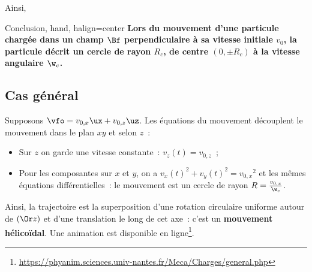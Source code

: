 \documentclass[../main/main.tex]{subfiles}
\begin{document}
Ainsi,
\begin{tror}{Conclusion, hand, halign=center}
    \bfseries
    Lors du mouvement d'une particule chargée dans un champ $\Bf$
    perpendiculaire à sa vitesse initiale $v_0$, la particule décrit un cercle de
    rayon $R_c$, de centre $(0,\pm R_c)$ à la vitesse angulaire $\w_c$.
\end{tror}

\subsection{Cas général}
Supposons $\vfo = v_{0,x}\ux + v_{0,z}\uz$. Les équations du mouvement
découplent le mouvement dans le plan $xy$ et selon $z$~:
\begin{itemize}
    \item Sur $z$ on garde une vitesse constante~: $v_z(t) = v_{0,z}$~;
    \item Pour les composantes sur $x$ et $y$, on a $v_x(t)^2 + v_y(t)^2 =
        v_{0,x}{}^2$ et les mêmes équations différentielles~: le mouvement est
        un cercle de rayon $R = \frac{v_{0,x}}{\w_c}$.
\end{itemize}
Ainsi, la trajectoire est la superposition d'une rotation circulaire uniforme
autour de $(\Or z)$ et d'une translation le long de cet axe~: c'est un
\textbf{mouvement hélicoïdal}. Une animation est disponible en
ligne\footnote{\url{https://phyanim.sciences.univ-nantes.fr/Meca/Charges/general.php}}.
\end{document}

